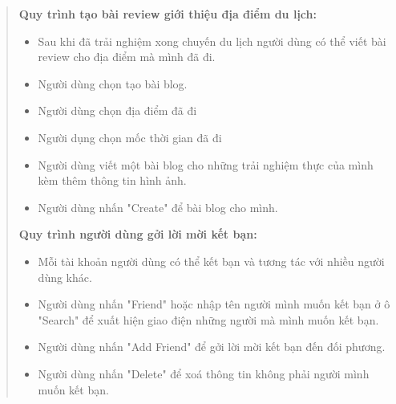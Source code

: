\begin{quote}
\begin{itemize}
    \end{itemize}
     \textbf{Quy trình tạo bài review giới thiệu địa điểm du lịch:  }
     \begin{itemize}
         \item Sau khi đã trải nghiệm xong chuyến du lịch người dùng có thể viết bài review cho địa điểm mà mình đã đi.
         \item Người dùng chọn tạo bài blog.
         \item Người dùng chọn địa điểm đã đi 
         \item Người dụng chọn mốc thời gian đã đi
         \item Người dùng viết một bài blog cho những trải nghiệm thực của mình kèm thêm thông tin hình ảnh.
         \item Người dùng nhấn "Create" để bài blog cho mình.
         
     \end{itemize}
     \textbf{Quy trình người dùng gởi lời mời kết bạn: }
     \begin{itemize}
         \item Mỗi tài khoản người dùng có thể kết bạn và tương tác với nhiều người dùng khác.
         \item Người dùng nhấn "Friend" hoặc nhập tên người mình muốn kết bạn ở ô "Search" để xuất hiện giao điện những người mà mình muốn kết bạn.
         \item Người dùng nhấn "Add Friend" để gởi lời mời kết bạn đến đối phương.
         \item Người dùng nhấn "Delete" để xoá thông tin không phải người mình muốn kết bạn.
         

\end{itemize}
\end{quote}
